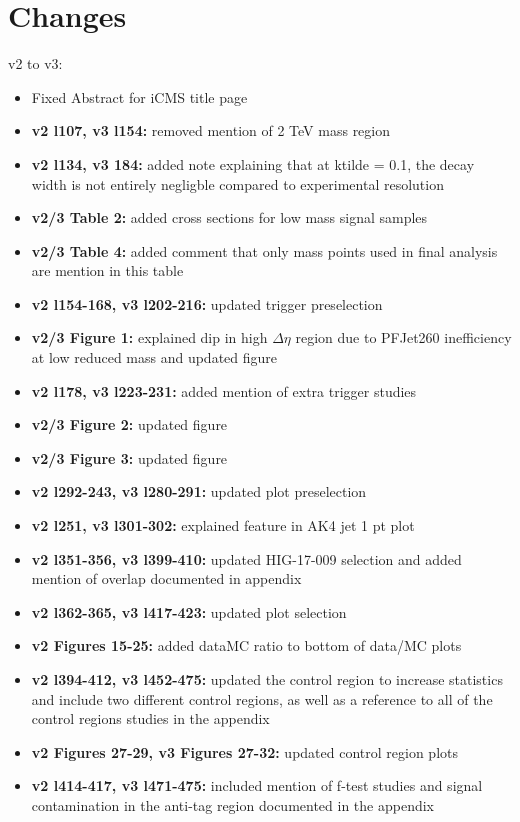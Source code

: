 \section{Changes\label{sec:ChangeLog}}

v2 to v3:

\begin{itemize}
\item{Fixed Abstract for iCMS title page}
\item{\textbf{v2 l107, v3 l154:} removed mention of 2 TeV mass region}
\item{\textbf{v2 l134, v3 184:} added note explaining that at ktilde = 0.1, the decay width is not entirely negligble compared to experimental resolution}
\item{\textbf{v2/3 Table 2:} added cross sections for low mass signal samples}
\item{\textbf{v2/3 Table 4:} added comment that only mass points used in final analysis are mention in this table}
\item{\textbf{v2 l154-168, v3 l202-216:} updated trigger preselection}
\item{\textbf{v2/3 Figure 1:} explained dip in high $\Delta\eta$ region due to PFJet260 inefficiency at low reduced mass and updated figure}
\item{\textbf{v2 l178, v3 l223-231:} added mention of extra trigger studies}
\item{\textbf{v2/3 Figure 2:} updated figure}
\item{\textbf{v2/3 Figure 3:} updated figure}
\item{\textbf{v2 l292-243, v3 l280-291:} updated plot preselection}
\item{\textbf{v2 l251, v3 l301-302:} explained feature in AK4 jet 1 pt plot}
\item{\textbf{v2 l351-356, v3 l399-410:} updated HIG-17-009 selection and added mention of overlap documented in appendix}
\item{\textbf{v2 l362-365, v3 l417-423:} updated plot selection}
\item{\textbf{v2 Figures 15-25:} added dataMC ratio to bottom of data/MC plots}
\item{\textbf{v2 l394-412, v3 l452-475:} updated the control region to increase statistics and include two different control regions, as well as a reference to all of the control regions studies in the appendix}
\item{\textbf{v2 Figures 27-29, v3 Figures 27-32:} updated control region plots}
\item{\textbf{v2 l414-417, v3 l471-475:} included mention of f-test studies and signal contamination in the anti-tag region documented in the appendix}

\end{itemize}
